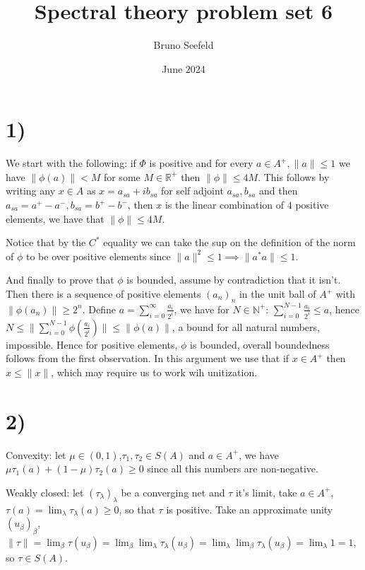\documentclass{article}
\title{Spectral theory problem set 6}
\author{Bruno Seefeld}
\date{June 2024}
\begin{document}
\maketitle

\section*{1)}

We start with the following: if $\Phi$ is positive and for every 
$a\in A^+, \|a\|\leq 1$ we have $\|\phi(a)\|<M$  for some $M\in \mathbb{R}^+$
then $\|\phi\|\leq 4M$. 
This follows by writing any $x\in A$ as $x=a_{sa}+ib_{sa}$ for self adjoint 
$a_{sa},b_{sa}$ and then $a_{sa}=a^+ -a^{-}, b_{sa}=b^+ -b^{-}$, then $x$
is the linear combination of $4$ positive elements, we have that $\|\phi\|\leq 4M$.

Notice that by the $C^\ast$ equality we can take the sup on the definition of
the norm of $\phi$ to be over positive elements since $\|a\|^2\leq 1\implies
\|a^\ast a\|\leq 1$. 

And finally to prove that $\phi$ is bounded, assume by contradiction that 
it isn't. Then there is a sequence of positive elements $(a_n)_n$ in the 
unit ball of $A^+$  with $\|\phi(a_n)\|\geq 2^n$. Define $a=\sum_{i=0}^\infty 
\frac{a_i}{2^i} $, we have for $N\in \mathbb{N}^+$: $\sum_{i=0}^{N-1} 
\frac{a_i}{2^i}\leq a$, hence $N\leq \|\sum_{i=0}^{N-1} 
\phi(\frac{a_i}{2^i})\|\leq \|\phi(a)\|$, a bound for all natural numbers, impossible.
Hence for positive elements, $\phi$ is bounded, overall boundedness follows from
the first observation. In this argument we use that if $x\in A^+$ then 
$x\leq \|x\|$, which may require us to work wih unitization.


\section*{2)}

Convexity: let $\mu\in (0,1)$,$\tau_1,\tau_2\in S(A)$ and $a\in A^+$, we have $\mu\tau_1(a)+(1-\mu)\tau_2(a)\geq 0$ since all this numbers are non-negative.

Weakly closed: let $(\tau_\lambda)_\lambda$ be a converging net and $\tau$ it's limit, take $a\in A^+$, $\tau(a)=\lim_\lambda \tau_\lambda(a)\geq 0$, so that $\tau$ is
positive. Take an approximate unity $(u_\beta)_\beta$, $\|\tau\|=\lim_\beta \tau(u_\beta)=\lim_\beta \lim_\lambda \tau_\lambda(u_\beta)=
\lim_\lambda\lim_\beta\tau_\lambda(u_\beta)=\lim_\lambda 1=1$, so $\tau\in S(A)$.
\end{document}
